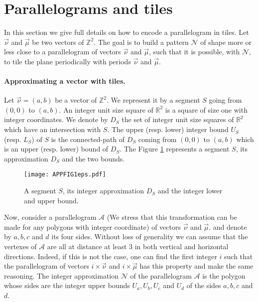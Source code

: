 \documentclass{llncs}
\newcommand{\Zgrid}{{\mathbb Z}^2}
\newcommand{\nn}{\vec\nu}
\newcommand{\mm}{\vec \mu}
\begin{document}
\section{Parallelograms and tiles}\label{app:tiling}

In this section we give full details on how to encode a parallelogram in tiles. Let $\nn$ and $\mm$ be two vectors of $\Zgrid$.
The goal is to build a pattern  $\mathcal{N}$ of shape more or less close to a parallelogram of
vectors $\nn$ and $\mm$, such that it is possible, with  $\mathcal{N}$, to tile the plane periodically with periods $\nn$
and $\mm$.

\smallskip

\paragraph{Approximating a vector with tiles.} Let $\nn=(a,b)$ be a vector of $\Zgrid$.
We represent it by a segment $S$ going from $(0,0)$ to $(a,b)$. An integer unit size square of $\mathbb{R}^2$
is a square of size one with integer coordinates. We denote by $D_S$ the set of integer unit size squares of
$\mathbb{R}^2$ which have an intersection with $S$. The upper (resp. lower) integer bound $U_S$ (resp. $L_S$) of $S$ is the connected-path of $D_S$
coming from $(0,0)$ to $(a,b)$ which is an upper (resp. lower) bound of $D_S$. The Figure \ref{FIGAPP1} represents a segment $S$, its approximation $D_S$ and the two bounds.

\begin{figure}
\begin{center}
\texttt{[image: APPFIG1eps.pdf]}
\end{center}
\caption{A segment $S$, its integer approximation $D_S$ and the integer lower and upper bound.}
\label{FIGAPP1}
\end{figure}

Now, consider a parallelogram $\mathcal{A}$ (We stress that this transformation can be made for any
polygons with integer coordinate) of vectors $\nn$ and $\mm$. and denote by $a,b,c$ and $d$ its four sides. Without loss of generality we can assume that the vertexes of $\mathcal{A}$ are all at distance at least $3$ in both
vertical and horizontal directions. Indeed, if this is not the case, one can find the first integer $i$ such that the parallelogram of
vectors $i\times \nn$ and $i\times \mm$ has this property and make the same reasoning. The integer approximation $\mathcal{N}$ of the
parallelogram $\mathcal{A}$ is the polygon whose sides are the integer upper bounds $U_a, U_b, U_c$ and $U_d$ of the
sides $a,b,c$ and $d$.
\end{document}
